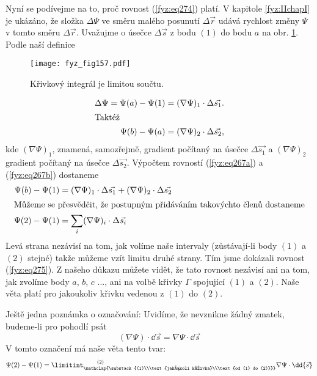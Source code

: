     Nyní se podívejme na to, proč rovnost (\ref{fyz:eq274}) platí. V kapitole   
    \ref{fyz:IIchapI} je ukázáno, že složka \(\Delta\Psi\) ve směru malého posunutí 
    \(\Delta\vec{r}\) udává rychlost změny \(\Psi\) v tomto směru \(\Delta\vec{r}\). Uvažujme o 
    úsečce \(\Delta\vec{s}\) z bodu \((1)\) do bodu \(a\) na obr. \ref{fyz:fig157}. Podle 
    naší definice
    
    \begin{figure}
      \centering
      \texttt{[image: fyz\_fig157.pdf]}
      \caption{Křivkový integrál je limitou součtu.}
      \label{fyz:fig157}
    \end{figure}
    
    \begin{align}
     \Delta\Psi = \Psi(a) - \Psi(1) 
       &= (\nabla\Psi)_1\cdot\Delta\vec{s_1}.         \label{fyz:eq267a}  \\
     \shortintertext{Taktéž}
     \Psi(b) - \Psi(a)
       &= (\nabla\Psi)_2\cdot\Delta\vec{s_2},         \label{fyz:eq267b}
    \end{align}
    kde \((\nabla\Psi)_1\), znamená, samozřejmě, gradient počítaný na úsečce \(\Delta\vec{s_1}\) a 
    \((\nabla\Psi)_2\) gradient počítaný na úsečce \(\Delta\vec{s_2}\). Výpočtem rovností 
    (\ref{fyz:eq267a}) a (\ref{fyz:eq267b}) dostaneme
    \begin{align}
     \Psi(b) - \Psi(1)              &= 
        (\nabla\Psi)_1\cdot\Delta\vec{s_1} + 
        (\nabla\Psi)_2\cdot\Delta\vec{s_2}               \label{fyz:eq268a} \\
     \shortintertext{Můžeme se přesvědčit, že postupným přidáváním takovýchto členů dostaneme}
     \Psi(2) - \Psi(1)              &= 
       \sum_i(\nabla\Psi)_i\cdot\Delta\vec{s_i}          \label{fyz:eq268b}
    \end{align}
    Levá strana nezávisí na tom, jak volíme naše intervaly (zů\-stá\-va\-jí-li body \((1)\) a 
    \((2)\) stejné) takže můžeme vzít limitu druhé strany. Tím jsme dokázali rovnost 
    (\ref{fyz:eq275}). Z našeho důkazu můžete vidět, že tato rovnost nezávisí ani na 
    tom, jak zvolíme body \(a\), \(b\), \(c\) ..., ani na volbě křivky \(\Gamma\) spojující \((1)\) 
    a \((2)\). Naše věta platí pro jakoukoliv křivku vedenou z \((1)\) do \((2)\).
    
    Ještě jedna poznámka o označování: Uvidíme, že nevznikne žádný zmatek, budeme-li pro pohodlí psát
    \begin{equation}\label{fyz:eq269}
     (\nabla\Psi)\cdot\dd{\vec{s}} = \nabla\Psi\cdot\dd{\vec{s}}
    \end{equation}     
    V tomto označení má naše věta tento tvar:
    \begin{equation}\label{fyz:eq273}
     \Psi(2)-\Psi(1) =  
       \limitint_{\mathclap{\substack{(1)\\\text{jakákoli křivka}\\\text{od (1) do 
       (2)}}}}^{\qquad(2)}
         \nabla\Psi\cdot\dd{\vec{s}}
    \end{equation}

